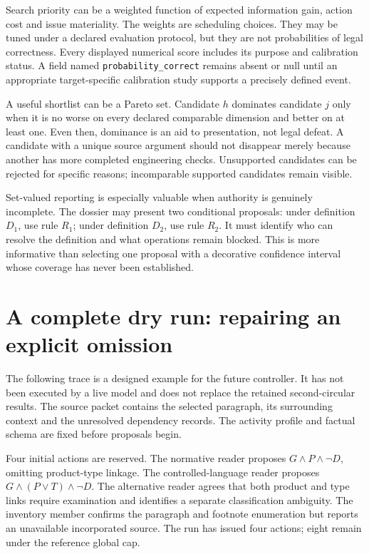 \documentclass[12pt,a4paper,oneside,openany]{book}
\begin{document}
Search priority can be a weighted function of expected information gain, action
cost and issue materiality. The weights are scheduling choices. They may be tuned
under a declared evaluation protocol, but they are not probabilities of legal
correctness. Every displayed numerical score includes its purpose and calibration
status. A field named \texttt{probability\_correct} remains absent or null until an
appropriate target-specific calibration study supports a precisely defined event.

A useful shortlist can be a Pareto set. Candidate $h$ dominates candidate $j$ only
when it is no worse on every declared comparable dimension and better on at least
one. Even then, dominance is an aid to presentation, not legal defeat. A candidate
with a unique source argument should not disappear merely because another has
more completed engineering checks. Unsupported candidates can be rejected for
specific reasons; incomparable supported candidates remain visible.

Set-valued reporting is especially valuable when authority is genuinely
incomplete. The dossier may present two conditional proposals: under definition
$D_1$, use rule $R_1$; under definition $D_2$, use rule $R_2$. It must identify who
can resolve the definition and what operations remain blocked. This is more
informative than selecting one proposal with a decorative confidence interval
whose coverage has never been established.

\section{A complete dry run: repairing an explicit omission}
\label{merge:M06:20}


The following trace is a designed example for the future controller. It has not
been executed by a live model and does not replace the retained second-circular
results. The source packet contains the selected paragraph, its surrounding
context and the unresolved dependency records. The activity profile and factual
schema are fixed before proposals begin.

Four initial actions are reserved. The normative reader proposes
$G\land P\land\neg D$, omitting product-type linkage. The controlled-language
reader proposes $G\land(P\lor T)\land\neg D$. The alternative reader agrees that
both product and type links require examination and identifies a separate
classification ambiguity. The inventory member confirms the paragraph and
footnote enumeration but reports an unavailable incorporated source. The run has
issued four actions; eight remain under the reference global cap.
\end{document}
